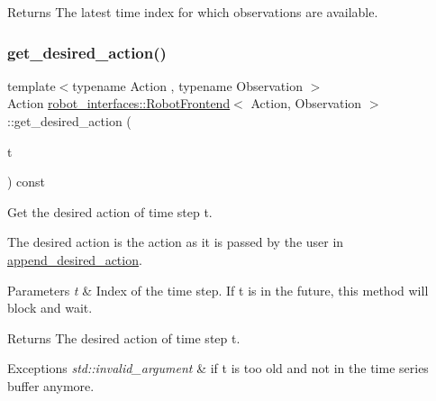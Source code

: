 \begin{DoxyReturn}{Returns}
The latest time index for which observations are available. 
\end{DoxyReturn}
\mbox{\label{classrobot__interfaces_1_1RobotFrontend_a8710ad1f0de000dfb099585e0ac7f140}} 
\subsubsection{\texorpdfstring{get\+\_\+desired\+\_\+action()}{get\_desired\_action()}}
{\footnotesize\ttfamily template$<$typename Action , typename Observation $>$ \\
Action \hyperlink{classrobot__interfaces_1_1RobotFrontend}{robot\+\_\+interfaces\+::\+Robot\+Frontend}$<$ Action, Observation $>$\+::get\+\_\+desired\+\_\+action (\begin{DoxyParamCaption}\item[{const Time\+Index \&}]{t }\end{DoxyParamCaption}) const\hspace{0.3cm}{\ttfamily [inline]}}



Get the desired action of time step t. 

The desired action is the action as it is passed by the user in \hyperlink{classrobot__interfaces_1_1RobotFrontend_a26c137f65b908d6eddffff75df38361a}{append\+\_\+desired\+\_\+action}.


\begin{DoxyParams}{Parameters}
{\em t} & Index of the time step. If t is in the future, this method will block and wait. \\
\hline
\end{DoxyParams}
\begin{DoxyReturn}{Returns}
The desired action of time step t. 
\end{DoxyReturn}

\begin{DoxyExceptions}{Exceptions}
{\em std\+::invalid\+\_\+argument} & if t is too old and not in the time series buffer anymore. \\
\hline
\end{DoxyExceptions}
\mbox{\label{classrobot__interfaces_1_1RobotFrontend_a95964f3d7aeaab7eec4c9a8782500c0f}} 
